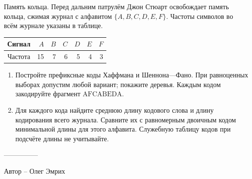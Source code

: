 \question
Память кольца. Перед дальним патрулём Джон Стюарт освобождает память кольца, сжимая журнал с алфавитом $\{A,B,C,D,E,F\}$. Частоты символов во всём журнале указаны в таблице.
\begin{center}\begin{tabular}{c|rrrrrr}Сигнал&$A$&$B$&$C$&$D$&$E$&$F$\\\hline Частота&15&7&6&5&4&3\end{tabular}\end{center}
\begin{enumerate}
\item Постройте префиксные коды Хаффмана и Шеннона---Фано. При равноценных выборах допустим любой вариант; покажите деревья. Каждым кодом закодируйте фрагмент $\mathrm{AFCABEDA}$.
\item Для каждого кода найдите среднюю длину кодового слова и длину кодирования всего журнала. Сравните их с равномерным двоичным кодом минимальной длины для этого алфавита. Служебную таблицу кодов при подсчёте длины не учитывайте.
\end{enumerate}

---------------

Автор -- Олег Эмрих
